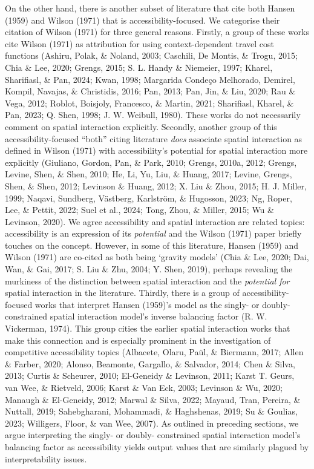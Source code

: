 \documentclass[
11pt, %
oneside, %
english, %
singlespacing, %
]{macthesis} %
\begin{document}
On the other hand, there is another subset of literature that cite both Hansen (1959) and Wilson (1971) that is accessibility-focused. We categorise their citation of Wilson (1971) for three general reasons. Firstly, a group of these works cite Wilson (1971) as attribution for using context-dependent travel cost functions (Ashiru, Polak, \& Noland, 2003; Caschili, De Montis, \& Trogu, 2015; Chia \& Lee, 2020; Grengs, 2015; S. L. Handy \& Niemeier, 1997; Kharel, Sharifiasl, \& Pan, 2024; Kwan, 1998; Margarida Condeço Melhorado, Demirel, Kompil, Navajas, \& Christidis, 2016; Pan, 2013; Pan, Jin, \& Liu, 2020; Rau \& Vega, 2012; Roblot, Boisjoly, Francesco, \& Martin, 2021; Sharifiasl, Kharel, \& Pan, 2023; Q. Shen, 1998; J. W. Weibull, 1980). These works do not necessarily comment on spatial interaction explicitly. Secondly, another group of this accessibility-focused ``both'' citing literature \emph{does} associate spatial interaction as defined in Wilson (1971) with accessibility's potential for spatial interaction more explicitly (Giuliano, Gordon, Pan, \& Park, 2010; Grengs, 2010a, 2012; Grengs, Levine, Shen, \& Shen, 2010; He, Li, Yu, Liu, \& Huang, 2017; Levine, Grengs, Shen, \& Shen, 2012; Levinson \& Huang, 2012; X. Liu \& Zhou, 2015; H. J. Miller, 1999; Naqavi, Sundberg, Västberg, Karlström, \& Hugosson, 2023; Ng, Roper, Lee, \& Pettit, 2022; Suel et al., 2024; Tong, Zhou, \& Miller, 2015; Wu \& Levinson, 2020). We agree accessibility and spatial interaction are related topics: accessibility is an expression of its \emph{potential} and the Wilson (1971) paper briefly touches on the concept. However, in some of this literature, Hansen (1959) and Wilson (1971) are co-cited as both being `gravity models' (Chia \& Lee, 2020; Dai, Wan, \& Gai, 2017; S. Liu \& Zhu, 2004; Y. Shen, 2019), perhaps revealing the murkiness of the distinction between spatial interaction and the \emph{potential for} spatial interaction in the literature. Thirdly, there is a group of accessibility-focused works that interpret Hansen (1959)'s model as the singly- or doubly- constrained spatial interaction model's inverse balancing factor (R. W. Vickerman, 1974). This group cities the earlier spatial interaction works that make this connection and is especially prominent in the investigation of competitive accessibility topics (Albacete, Olaru, Paül, \& Biermann, 2017; Allen \& Farber, 2020; Alonso, Beamonte, Gargallo, \& Salvador, 2014; Chen \& Silva, 2013; Curtis \& Scheurer, 2010; El-Geneidy \& Levinson, 2011; Karst T. Geurs, van Wee, \& Rietveld, 2006; Karst \& Van Eck, 2003; Levinson \& Wu, 2020; Manaugh \& El-Geneidy, 2012; Marwal \& Silva, 2022; Mayaud, Tran, Pereira, \& Nuttall, 2019; Sahebgharani, Mohammadi, \& Haghshenas, 2019; Su \& Goulias, 2023; Willigers, Floor, \& van Wee, 2007). As outlined in preceding sections, we argue interpreting the singly- or doubly- constrained spatial interaction model's balancing factor as accessibility yields output values that are similarly plagued by interpretability issues.
\end{document}
